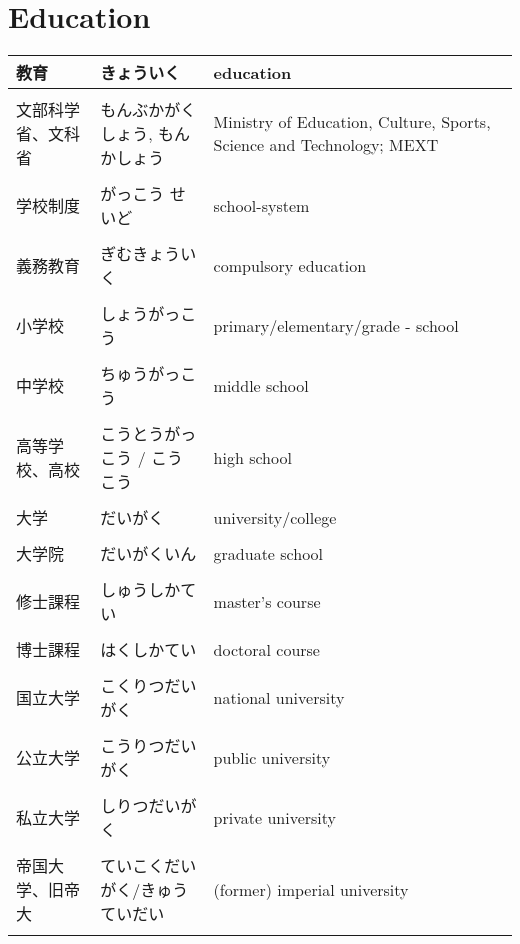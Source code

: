 \documentclass{article}
\newcommand\tabni[1][0.2cm]{\hspace*{#1}}
\begin{document}
\section{ \tabni Education }
\begin{tabular}{ l | p{6.7cm} | p{7.5cm} }
教育 &  きょういく  & education \\ \hline \\[-1em]
文部科学省、文科省 &  もんぶかがくしょう, もんかしょう  & Ministry of Education, Culture, Sports, Science and Technology; MEXT \\ \hline \\[-1em]
学校制度 &  がっこう せいど   & school-system \\ \hline \\[-1em]
義務教育 &  ぎむきょういく  & compulsory education \\ \hline \\[-1em]
小学校 & しょうがっこう & primary/elementary/grade - school \\ \hline \\[-1em]
中学校 & ちゅうがっこう & middle school \\ \hline \\[-1em]
高等学校、高校 &  こうとうがっこう /  こうこう  & high school \\ \hline \\[-1em]
大学 &  だいがく  & university/college\\ \hline \\[-1em]
大学院  & だいがくいん  & graduate school \\ \hline \\[-1em]
修士課程  &  しゅうしかてい  & master's course \\ \hline \\[-1em]
博士課程  &  はくしかてい  & doctoral course \\ \hline \\[-1em]
国立大学 &  こくりつだいがく  & national university \\ \hline \\[-1em]
公立大学 &  こうりつだいがく  & public university\\ \hline \\[-1em]
私立大学 &  しりつだいがく & private university\\ \hline \\[-1em]
帝国大学、旧帝大 &  ていこくだいがく/きゅうていだい  & (former) imperial university \\ \hline \\[-1em]

\end{tabular}
\end{document}
